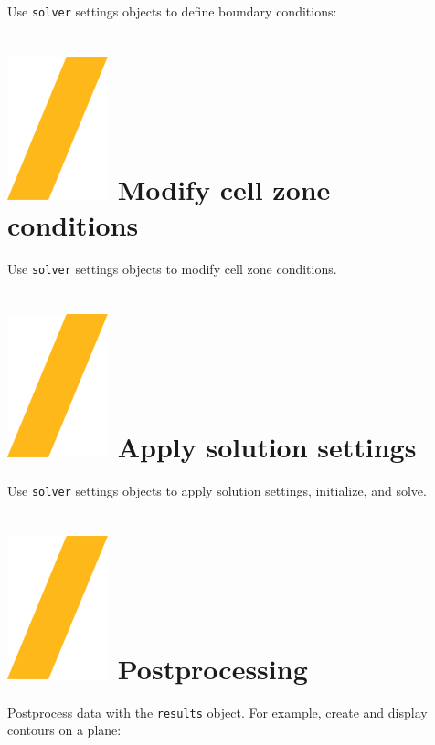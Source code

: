 \documentclass[9pt,landscape]{article}
\begin{document}
\begin{multicols}{3}
Use \texttt{solver} settings objects to define boundary conditions:


\section{\includegraphics[height=\fontcharht\font`\S]{slash.png}  Modify cell zone conditions} 
Use \texttt{solver} settings objects to modify cell zone conditions.


\vfill

\section{\includegraphics[height=\fontcharht\font`\S]{slash.png}  Apply solution settings}
Use \texttt{solver} settings objects to apply solution settings, initialize, and solve.


\section{\includegraphics[height=\fontcharht\font`\S]{slash.png}  Postprocessing}
Postprocess data with the \texttt{results} object. For example, create and display contours on a plane:


\end{multicols}
\end{document}
